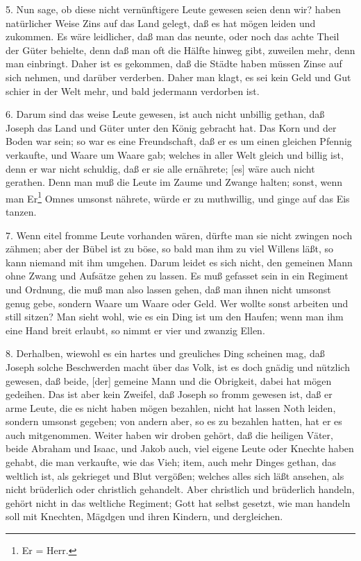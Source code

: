 5. Nun sage, ob diese nicht vernünftigere Leute gewesen seien denn wir? haben natürlicher Weise Zins auf das Land gelegt, daß es hat mögen leiden und zukommen. Es wäre leidlicher, daß man das neunte, oder noch das achte Theil der Güter behielte, denn daß man oft die Hälfte hinweg gibt, zuweilen mehr, denn man einbringt. Daher ist es gekommen, daß die Städte haben müssen Zinse auf sich nehmen, und darüber verderben. Daher man klagt, es sei kein Geld und Gut schier in der Welt mehr, und bald jedermann verdorben ist.

6. Darum sind das weise Leute gewesen, ist auch nicht unbillig gethan, daß Joseph das Land und Güter unter den König gebracht hat. Das Korn und der Boden war sein; so war es eine Freundschaft, daß er es um einen gleichen Pfennig verkaufte, und Waare um Waare gab; welches in aller Welt gleich und billig ist, denn er war nicht schuldig, daß er sie alle ernährete; [es] wäre auch nicht gerathen. Denn man muß die Leute im Zaume und Zwange halten; sonst, wenn man Er\footnote{Er = Herr.} Omnes umsonst nährete, würde er zu muthwillig, und ginge auf das Eis tanzen.

7. Wenn eitel fromme Leute vorhanden wären, dürfte man sie nicht zwingen noch zähmen; aber der Bübel ist zu böse, so bald man ihm zu viel Willens läßt, so kann niemand mit ihm umgehen. Darum leidet es sich nicht, den gemeinen Mann ohne Zwang und Aufsätze gehen zu lassen. Es muß gefasset sein in ein Regiment und Ordnung, die muß man also lassen gehen, daß man ihnen nicht umsonst genug gebe, sondern Waare um Waare oder Geld. Wer wollte sonst arbeiten und still sitzen? Man sieht wohl, wie es ein Ding ist um den Haufen; wenn man ihm eine Hand breit erlaubt, so nimmt er vier und zwanzig Ellen.

8. Derhalben, wiewohl es ein hartes und greuliches Ding scheinen mag, daß Joseph solche Beschwerden macht über das Volk, ist es doch gnädig und nützlich gewesen, daß beide, [der] gemeine Mann und die Obrigkeit, dabei hat mögen gedeihen. Das ist aber kein Zweifel, daß Joseph so fromm gewesen ist, daß er arme Leute, die es nicht haben mögen bezahlen, nicht hat lassen Noth leiden, sondern umsonst gegeben; von andern aber, so es zu bezahlen hatten, hat er es auch mitgenommen. Weiter haben wir droben gehört, daß die heiligen Väter, beide Abraham und Isaac, und Jakob auch, viel eigene Leute oder Knechte haben gehabt, die man verkaufte, wie das Vieh; item, auch mehr Dinges gethan, das weltlich ist, als gekrieget und Blut vergößen; welches alles sich läßt ansehen, als nicht brüderlich oder christlich gehandelt. Aber christlich und brüderlich handeln, gehört nicht in das weltliche Regiment; Gott hat selbst gesetzt, wie man handeln soll mit Knechten, Mägdgen und ihren Kindern, und dergleichen.

